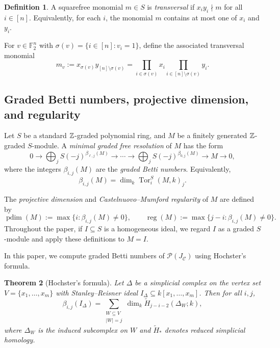 \documentclass[12pt]{amsart}
\newtheorem{theorem}{Theorem}[section]
\theoremstyle{remark}
\theoremstyle{definition}
\newtheorem{definition}[theorem]{Definition}
\DeclareMathOperator{\Tor}{Tor}
\DeclareMathOperator{\reg}{reg}
\DeclareMathOperator{\pd}{pdim}
\newcommand{\F}{\mathbb{F}}
\newcommand{\C}{\mathcal{C}}
\def\P{{\mathcal P}}
\begin{document}
\begin{definition}\label{def:transversal_monomial}
A squarefree monomial $m\in S$ is \emph{transversal} if $x_i y_i\nmid m$ for all $i\in[n]$.
Equivalently, for each $i$, the monomial $m$ contains at most one of $x_i$ and $y_i$.

For $v\in\F_2^n$ with $\sigma(v)=\{i\in[n]: v_i=1\}$, define the associated transversal monomial
\[
m_v  :=  x_{\sigma(v)} y_{[n]\setminus\sigma(v)}
 = \prod_{i\in\sigma(v)} x_i \prod_{i\in[n]\setminus\sigma(v)} y_i.
\]
\end{definition}

\subsection{Graded Betti numbers, projective dimension, and regularity}\label{subsec:betti-pd-reg}

Let $S$ be a standard $\Bbb Z$-graded polynomial ring,
and $M$ be a finitely generated $\Bbb Z$-graded $S$-module. A \emph{minimal graded free resolution}
of $M$ has the form
\[
0 \longrightarrow \bigoplus_j S(-j)^{\beta_{\ell,j}(M)}
\longrightarrow \cdots \longrightarrow
\bigoplus_j S(-j)^{\beta_{0,j}(M)}
\longrightarrow M \longrightarrow 0,
\]
where  the integers $\beta_{i,j}(M)$ are the \emph{graded Betti numbers}.
Equivalently,
\[
\beta_{i,j}(M)=\dim_k \Tor_i^S(M,k)_j .
\]

The \emph{projective dimension} and \emph{Castelnuovo--Mumford regularity} of $M$ are defined by
\[
\pd(M):=\max\{  i : \beta_{i,j}(M)\neq 0 \},
\qquad
\reg(M):=\max\{  j-i : \beta_{i,j}(M)\neq 0 \}.
\]
Throughout the paper, if $I\subseteq S$ is a homogeneous ideal, we regard $I$ as a graded $S$-module
and apply these definitions to $M=I$.

In this paper, we compute graded Betti numbers of $\P(J_\C)$ using Hochster’s formula.

\begin{theorem}[Hochster's formula]\label{thm:hochster}
Let $\Delta$ be a simplicial complex on the vertex set $V=\{x_1,\dots,x_m\}$ with
Stanley--Reisner ideal $I_\Delta\subseteq k[x_1,\dots,x_m]$. Then for all $i,j$,
\[
\beta_{i,j}(I_\Delta)
=\sum_{\substack{W\subseteq V\\|W|=j}}
\dim_k \widetilde H_{j-i-2}(\Delta_W;k),
\]
where $\Delta_W$ is the induced subcomplex on $W$ and $\widetilde H_\ast$ denotes reduced simplicial
homology.
\end{theorem}
\end{document}

